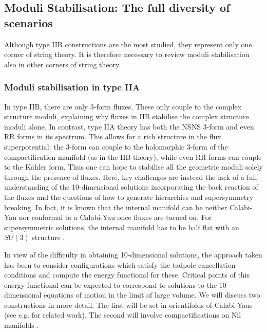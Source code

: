\subsection{Moduli Stabilisation: The full diversity of scenarios}

Although type IIB constructions are the most studied, they represent only one corner of string theory. It is therefore necessary to review moduli stabilisation also in other corners of string theory.

\subsubsection{Moduli stabilisation in type IIA}

In type IIB, there are only 3-form fluxes. These only couple to the complex structure moduli, explaining why fluxes in IIB stabilise the complex structure moduli alone.
In contrast, type IIA theory has both the NSNS 3-form and even RR forms in its spectrum. This allows for a rich structure in the
flux superpotential: the 3-form can couple to the holomorphic 3-form  of the compactification manifold (as in the IIB theory), while even RR forms
can couple to the K\"ahler form. Thus one can hope to stabilise all the geometric moduli solely through the presence of fluxes.  Here, 
key challenges are instead the lack of a full understanding of the 10-dimensional solutions incorporating the back reaction of the fluxes and the questions of how to generate hierarchies and supersymmetry breaking. In fact, it is known that the internal manifold can be neither Calabi-Yau nor conformal to a Calabi-Yau once fluxes are turned on. For supersymmetric solutions, the internal manifold has to be half flat with an $SU(3)$ structure \cite{Behrndt:2004mj, Behrndt:2004km,  House:2005yc, Lust:2004ig}.

In view of the difficulty in obtaining 10-dimensional solutions, the approach taken has been to consider configurations which satisfy the tadpole cancellation conditions and compute the energy functional for these. Critical points of this energy functional can be expected to correspond
to solutions to the 10-dimensional equations of motion in the limit of large volume. We will discuss two constructions in more detail. The first will be set in orientifolds of Calabi-Yaus \cite{DeWolfe:2005uu} (see  e.g. \cite{Kachru:2004jr, Derendinger:2004jn,  Aldazabal:2006up, Saueressig:2005es, Villadoro:2005cu, Ihl:2007ah} for related work). The second will involve compactifications on Nil manifolds \cite{Silverstein:2007ac}.

